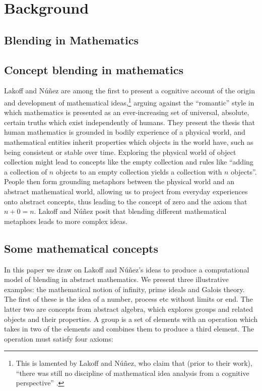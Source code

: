 \section{Background}
\label{sec:background}

\subsection{Blending in Mathematics}
\label{subsec:mathblend}

\subsection{Concept blending in mathematics}
Lakoff and N{\'u}{\~n}ez \citep{lakoff} are among the first to present
a cognitive account of the origin and development of mathematical
ideas,\footnote{This is lamented by Lakoff and N{\'u}{\~n}ez, who
claim that (prior to their work), ``there was still no discipline of
mathematical idea analysis from a cognitive perspective''
\citep{lakoff}.} arguing against the ``romantic'' style in which
mathematics is presented as an ever-increasing set of universal,
absolute, certain truths which exist independently of humans. They
present the thesis that human mathematics is grounded in bodily
experience of a physical world, and mathematical entities inherit
properties which objects in the world have, such as being consistent
or stable over time.  Exploring the physical world of object
collection might lead to concepts like the empty collection and rules
like ``adding a collection of $n$ objects to an empty collection
yields a collection with $n$ objects''. People then form grounding
metaphors between the physical world and an abstract mathematical
world, allowing us to project from everyday experiences onto abstract
concepts, thus leading to the concept of zero and the axiom that $n +
0 = n$. Lakoff and N{\'u}{\~n}ez posit that blending different
mathematical metaphors leads to more complex ideas. 

\subsection{Some mathematical concepts}
In this paper we draw on Lakoff and N{\'u}{\~n}ez's ideas to produce a
computational model of blending in abstract mathematics. We present
three illustrative examples: the mathematical notion of infinity,
prime ideals and Galois theory. The first of these is the idea of a
number, process etc without limits or end. The latter two are concepts
from abstract algebra, which explores groups and related objects and
their properties. A group is a set of elements with an operation which
takes in two of the elements and combines them to produce a third
element. The operation must satisfy four axioms:

